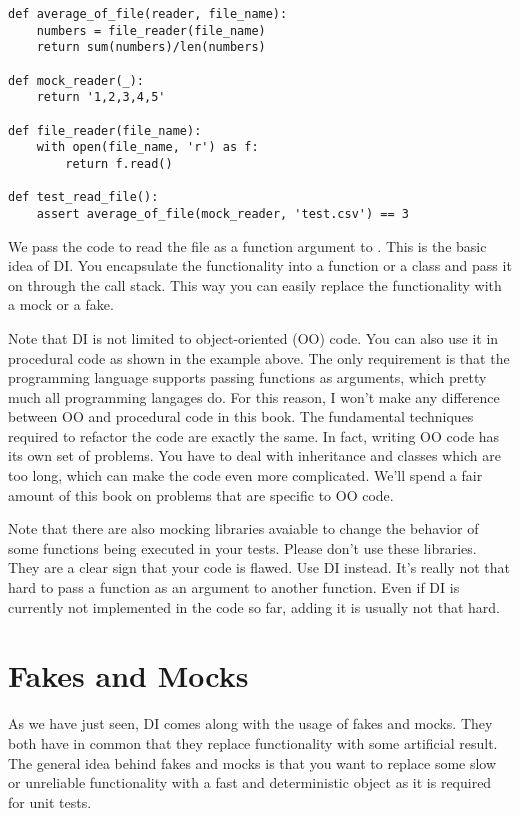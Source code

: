 \begin{programcode}{}
\begin{verbatim}
def average_of_file(reader, file_name):
    numbers = file_reader(file_name)
    return sum(numbers)/len(numbers)

def mock_reader(_):
    return '1,2,3,4,5'

def file_reader(file_name):
    with open(file_name, 'r') as f:
        return f.read()

def test_read_file():
    assert average_of_file(mock_reader, 'test.csv') == 3
\end{verbatim}
\end{programcode}

We pass the code to read the file as a function argument to . This is the basic idea of DI. You encapsulate the functionality into a function or a class and pass it on through the call stack. This way you can easily replace the functionality with a mock or a fake.

Note that DI is not limited to object-oriented (OO) code. You can also use it in procedural code as shown in the example above. The only requirement is that the programming language supports passing functions as arguments, which pretty much all programming langages do. For this reason, I won't make any difference between OO and procedural code in this book. The fundamental techniques required to refactor the code are exactly the same. In fact, writing OO code has its own set of problems. You have to deal with inheritance and classes which are too long, which can make the code even more complicated. We'll spend a fair amount of this book on problems that are specific to OO code.

Note that there are also mocking libraries avaiable to change the behavior of some functions being executed in your tests. Please don't use these libraries. They are a clear sign that your code is flawed. Use DI instead. It's really not that hard to pass a function as an argument to another function. Even if DI is currently not implemented in the code so far, adding it is usually not that hard.

\section{Fakes and Mocks}

As we have just seen, DI comes along with the usage of fakes and mocks. They both have in common that they replace functionality with some artificial result. The general idea behind fakes and mocks is that you want to replace some slow or unreliable functionality with a fast and deterministic object as it is required for unit tests.


